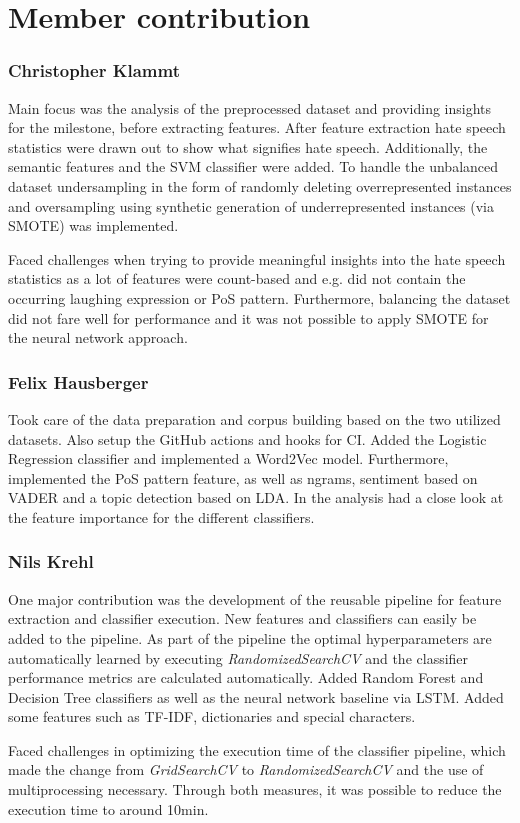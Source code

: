 \section*{Member contribution}

\subsubsection*{Christopher Klammt}

Main focus was the analysis of the preprocessed dataset and providing insights for the milestone, before extracting features. After feature extraction hate speech statistics were drawn out to show what signifies hate speech. Additionally, the semantic features and the SVM classifier were added. To handle the unbalanced dataset undersampling in the form of randomly deleting overrepresented instances and oversampling using synthetic generation of underrepresented instances (via SMOTE) was implemented.

Faced challenges when trying to provide meaningful insights into the hate speech statistics as a lot of features were count-based and e.g. did not contain the occurring laughing expression or PoS pattern. Furthermore, balancing the dataset did not fare well for performance and it was not possible to apply SMOTE for the neural network approach.

\subsubsection*{Felix Hausberger}

Took care of the data preparation and corpus building based on the two utilized datasets. Also setup the GitHub actions and hooks for CI. Added the Logistic Regression classifier and implemented a Word2Vec model. Furthermore, implemented the PoS pattern feature, as well as ngrams, sentiment based on VADER and a topic detection based on LDA. In the analysis had a close look at the feature importance for the different classifiers.


\subsubsection*{Nils Krehl}

One major contribution was the development of the reusable pipeline for feature extraction and classifier execution. New features and classifiers can easily be added to the pipeline. As part of the pipeline the optimal hyperparameters are automatically learned by executing \textit{RandomizedSearchCV} and the classifier performance metrics are calculated automatically. Added Random Forest and Decision Tree classifiers as well as the neural network baseline via LSTM. Added some features such as TF-IDF, dictionaries and special characters.

Faced challenges in optimizing the execution time of the classifier pipeline, which made the change from \textit{GridSearchCV} to \textit{RandomizedSearchCV} and the use of multiprocessing necessary. Through both measures, it was possible to reduce the execution time to around 10min. 
